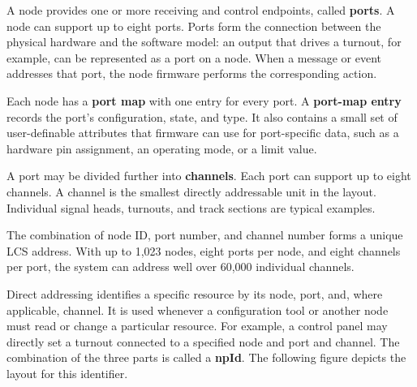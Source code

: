 
A node provides one or more receiving and control endpoints, called \textbf{ports}. A node can support up to eight ports. Ports form the connection between the physical hardware and the software model: an output that drives a turnout, for example, can be represented as a port on a node. When a message or event addresses that port, the node firmware performs the corresponding action.

Each node has a \textbf{port map} with one entry for every port. A \textbf{port-map entry} records the port's configuration, state, and type. It also contains a small set of user-definable attributes that firmware can use for port-specific data, such as a hardware pin assignment, an operating mode, or a limit value.


A port may be divided further into \textbf{channels}. Each port can support up to eight channels. A channel is the smallest directly addressable unit in the layout. Individual signal heads, turnouts, and track sections are typical examples.

The combination of node ID, port number, and channel number forms a unique LCS address. With up to 1,023 nodes, eight ports per node, and eight channels per port, the system can address well over 60,000 individual channels.


Direct addressing identifies a specific resource by its node, port, and, where applicable, channel. It is used whenever a configuration tool or another node must read or change a particular resource. For example, a control panel may directly set a turnout connected to a specified node and port and channel. The combination of the three parts is called a \textbf{npId}. The following figure depicts the layout for this identifier.

\begin{center}
\end{center}

